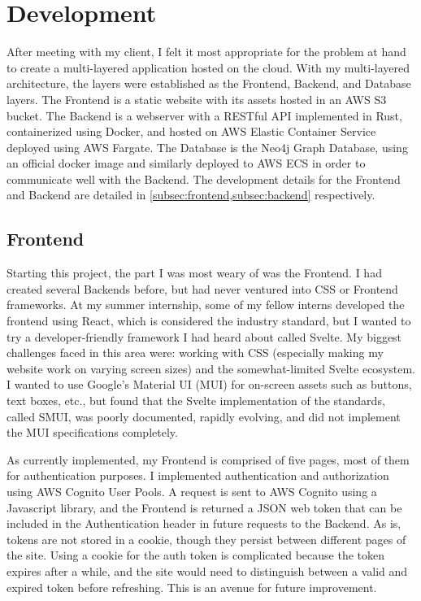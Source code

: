 \documentclass[advisory-ia.tex]{subfiles}
\begin{document}
  \section{Development}
  \label{sec:develop}
  After meeting with my client, I felt it most appropriate for the problem at hand to create a multi-layered application hosted on the cloud.
  With my multi-layered architecture, the layers were established as the Frontend, Backend, and Database layers.
  The Frontend is a static website with its assets hosted in an AWS S3 bucket.
  The Backend is a webserver with a RESTful API implemented in Rust, containerized using Docker, and hosted on AWS Elastic Container Service deployed using AWS Fargate.
  The Database is the Neo4j Graph Database, using an official docker image and similarly deployed to AWS ECS in order to communicate well with the Backend.
  The development details for the Frontend and Backend are detailed in \cref{subsec:frontend,subsec:backend} respectively.

  \subsection{Frontend}
  \label{subsec:frontend}
  Starting this project, the part I was most weary of was the Frontend.
  I had created several Backends before, but had never ventured into CSS or Frontend frameworks.
  At my summer internship, some of my fellow interns developed the frontend using React, which is considered the industry standard, but I wanted to try a developer-friendly framework I had heard about called Svelte.
  My biggest challenges faced in this area were: working with CSS (especially making my website work on varying screen sizes) and the somewhat-limited Svelte ecosystem.
  I wanted to use Google's Material UI (MUI) for on-screen assets such as buttons, text boxes, etc., but found that the Svelte implementation of the standards, called SMUI, was poorly documented, rapidly evolving, and did not implement the MUI specifications completely.

  As currently implemented, my Frontend is comprised of five pages, most of them for authentication purposes.
  I implemented authentication and authorization using AWS Cognito User Pools.
  A request is sent to AWS Cognito using a Javascript library, and the Frontend is returned a JSON web token that can be included in the Authentication header in future requests to the Backend.
  As is, tokens are not stored in a cookie, though they persist between different pages of the site.
  Using a cookie for the auth token is complicated because the token expires after a while, and the site would need to distinguish between a valid and expired token before refreshing.
  This is an avenue for future improvement.
\end{document}
